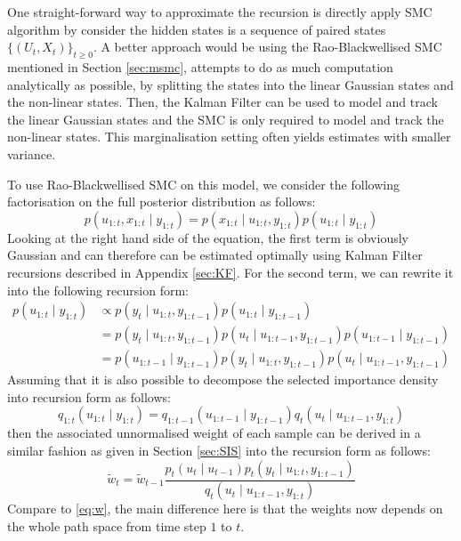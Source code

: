 One straight-forward way to approximate the recursion is directly apply SMC algorithm by consider the hidden states is a sequence of paired states $\{(U_t, X_t)\}_{t \geq 0}$. A better approach would be using the Rao-Blackwellised SMC mentioned in Section \ref{sec:msmc}, attempts to do as much computation analytically as possible, by splitting the states into the linear Gaussian states and the non-linear states. Then, the Kalman Filter can be used to model and track the linear Gaussian states and the SMC is only required to model and track the non-linear states. This marginalisation setting often yields estimates with smaller variance.

To use Rao-Blackwellised SMC on this model, we consider the following factorisation on the full posterior distribution as follows:
\begin{equation}
  p(u_{1:t}, x_{1:t} \mid y_{1:t}) = p(x_{1:t} \mid u_{1:t}, y_{1:t}) p(u_{1:t} \mid y_{1:t})
\end{equation}
Looking at the right hand side of the equation, the first term is obviously Gaussian and can therefore can be estimated optimally using Kalman Filter recursions described in Appendix \ref{sec:KF}. For the second term, we can rewrite it into the following recursion form:
\begin{align}
p(u_{1:t} \mid y_{1:t}) &\propto p(y_t \mid u_{1:t}, y_{1:t-1}) p(u_{1:t} \mid y_{1:t-1}) \nonumber \\
&=  p(y_t \mid u_{1:t}, y_{1:t-1}) p(u_t \mid u_{1:t-1}, y_{1:t-1}) p(u_{1:t-1} \mid y_{1:t-1}) \nonumber \\
&=  p(u_{1:t-1} \mid y_{1:t-1}) p(y_t \mid u_{1:t}, y_{1:t-1}) p(u_t \mid u_{1:t-1}, y_{1:t-1})
\label{eq:msmc}
\end{align}
Assuming that it is also possible to decompose the selected importance density into recursion form as follows:
\begin{equation}
        q_{1:t}(u_{1:t} \mid y_{1:t}) = q_{1:t-1}(u_{1:t-1} \mid y_{1:t-1}) q_t(u_t \mid u_{1:t-1}, y_{1:t})
\label{eq:q2}
\end{equation}
then the associated unnormalised weight of each sample can be derived in a similar fashion as given in Section \ref{sec:SIS} into the recursion form as follows:
\begin{equation}
   \tilde{w}_t  = \tilde{w}_{t-1} \dfrac{p_t(u_t \mid u_{t-1})p_t(y_t \mid u_{1:t}, y_{1:t-1})}{q_t(u_t \mid u_{1:t-1}, y_{1:t})}
   \label{eq:wsmsc}
\end{equation}
Compare to \eqref{eq:w}, the main difference here is that the weights now depends on the whole path space from time step $1$ to $t$.

